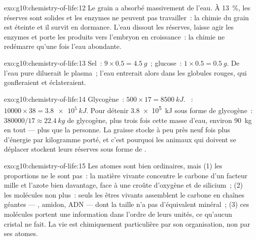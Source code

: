 \begin{solution}{exo:g10:chemistry-of-life:12}
Le grain a absorbé massivement de l'eau. À 13~\%, les réserves sont
solides et les enzymes ne peuvent pas travailler~: la chimie du grain
est éteinte et il survit en dormance. L'eau dissout les réserves,
laisse agir les enzymes et porte les produits vers l'embryon en
croissance~: la chimie ne redémarre qu'une fois l'eau abondante.
\end{solution}

\begin{solution}{exo:g10:chemistry-of-life:13}
Sel~: $9 \times 0.5 = \qty{4.5}{g}$~; glucose~: $1 \times 0.5 =
\qty{0.5}{g}$. De l'eau pure diluerait le plasma~; l'eau entrerait
alors dans les globules rouges, qui gonfleraient et éclateraient.
\end{solution}

\begin{solution}{exo:g10:chemistry-of-life:14}
Glycogène~: $500 \times 17 = \qty{8500}{kJ}$. ~: $10000 \times 38 =
\qty{3.8e5}{kJ}$. Pour détenir \qty{3.8e5}{kJ} sous forme de glycogène~: $380000/17
\approx \qty{22.4}{kg}$ de glycogène, plus trois fois cette masse
d'eau, environ \qty{90}{kg} en tout --- plus que la personne. La
graisse stocke à peu près neuf fois plus d'énergie par kilogramme
porté, et c'est pourquoi les animaux qui doivent se déplacer stockent
leurs réserves sous forme de .
\end{solution}

\begin{solution}{exo:g10:chemistry-of-life:15}
Les atomes sont bien ordinaires, mais (1) les proportions ne le sont
pas~: la matière vivante concentre le carbone d'un facteur mille et
l'azote bien davantage, face à une croûte d'oxygène et de silicium~;
(2) les molécules non plus~: seuls les êtres vivants assemblent le
carbone en chaînes géantes --- , amidon, ADN --- dont la
taille n'a pas d'équivalent minéral~; (3) ces molécules portent une
information dans l'ordre de leurs unités, ce qu'aucun cristal ne fait.
La vie est chimiquement particulière par son organisation, non par ses
atomes.
\end{solution}

